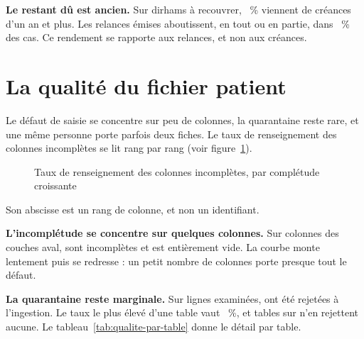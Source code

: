\textbf{Le restant dû est ancien.} Sur 
dirhams à recouvrer, ~\% viennent de créances d'un an et
plus. Les  relances émises aboutissent, en tout ou en partie, dans
~\% des cas. Ce rendement se rapporte aux relances,
et non aux créances.

\section{La qualité du fichier patient}

Le défaut de saisie se concentre sur peu de colonnes, la quarantaine reste rare, et une même
personne porte parfois deux fiches. Le taux de renseignement des colonnes incomplètes se lit rang par
rang (voir figure~\ref{fig:completude-colonnes}).

\begin{figure}[htbp]
\centering
{}
\caption{Taux de renseignement des colonnes incomplètes, par complétude croissante}\label{fig:completude-colonnes}
\end{figure}

Son abscisse est un rang de colonne, et non un identifiant.

\textbf{L'incomplétude se concentre sur quelques colonnes.} Sur
 colonnes des couches aval,  sont
incomplètes et  est entièrement vide. La courbe monte lentement puis se
redresse : un petit nombre de colonnes porte presque tout le défaut.

\textbf{La quarantaine reste marginale.} Sur 
lignes examinées,  ont été rejetées à l'ingestion. Le taux
le plus élevé d'une table vaut ~\%, et
 tables sur  n'en rejettent aucune.
Le tableau~\ref{tab:qualite-par-table} donne le détail par table.

